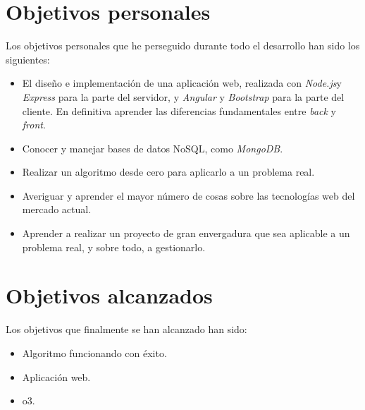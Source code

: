 \section{Objetivos personales}\label{objetivos-personales}
Los objetivos personales que he perseguido durante todo el desarrollo han sido los siguientes:
\begin{itemize}
\tightlist
\item
 El diseño e implementación de una aplicación web, realizada con \emph{Node.js}y \emph{Express} para la parte del
servidor, y \emph{Angular} y \emph{Bootstrap} para la parte del cliente.  En definitiva aprender las diferencias fundamentales entre \emph{back} y \emph{front}.
\item
  Conocer y manejar bases de datos NoSQL, como \emph{MongoDB}.
\item
  Realizar un algoritmo desde cero para aplicarlo a un problema real.
\item
  Averiguar y aprender el mayor número de cosas sobre las tecnologías web del mercado actual. 
\item
  Aprender a realizar un proyecto de gran envergadura que sea aplicable a un problema real, y sobre todo, a gestionarlo.
\end{itemize}

\section{Objetivos alcanzados}\label{objetivos-alcanzados}
Los objetivos que finalmente se han alcanzado han sido: 
\begin{itemize}
\tightlist
\item
  Algoritmo funcionando con éxito.
\item
  Aplicación web. 
\item
  o3.
\end{itemize}
